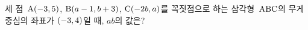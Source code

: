 세 점~$\mathrm{A}(-3{,}\mkern3mu\mathopen{}5)$, $\mathrm{B}(a-1{,}\mkern3mu\mathopen{}b+3)$, $\mathrm{C}(-2b{,}\mkern3mu\mathopen{}a)$를 꼭짓점으로 하는 삼각형~$\mathrm{ABC}$의 무게중심의 좌표가 $(-3{,}\mkern3mu\mathopen{}4)$일 때, $ab$의 값은?
